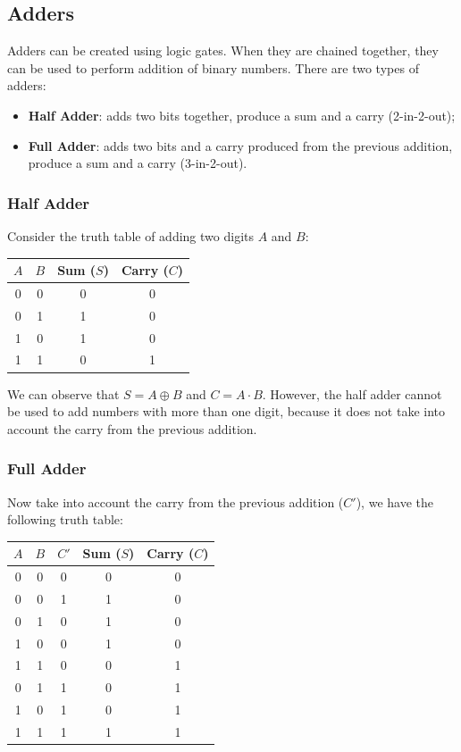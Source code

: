 \subsection{Adders}

Adders can be created using logic gates. When they are chained together, they can be used
to perform addition of binary numbers. There are two types of adders:
\begin{itemize}
    \item \textbf{Half Adder}: adds two bits together, produce a sum and a carry (2-in-2-out);
    \item \textbf{Full Adder}: adds two bits and a carry produced from the previous addition,
                                produce a sum and a carry (3-in-2-out).
\end{itemize}

\subsubsection{Half Adder}

Consider the truth table of adding two digits $A$ and $B$:
\begin{table}[h]
\centering
\begin{tabular}{|c|c||c|c|}
    \hline
    $A$ & $B$ & Sum ($S$) & Carry ($C$) \\
    \hline
    0 & 0 & 0 & 0 \\
    0 & 1 & 1 & 0 \\
    1 & 0 & 1 & 0 \\
    1 & 1 & 0 & 1 \\
    \hline
\end{tabular}
\end{table}

We can observe that $S=A\oplus B$ and $C=A\cdot B$. However, the half adder cannot be used
to add numbers with more than one digit, because it does not take into account the carry
from the previous addition.

\subsubsection{Full Adder}

Now take into account the carry from the previous addition ($C'$), we have the following truth table:
\begin{table}[h]
\centering
\begin{tabular}{|c|c|c||c|c|}
    \hline
    $A$ & $B$ & $C'$ & Sum ($S$) & Carry ($C$) \\
    \hline
    0 & 0 & 0 & 0 & 0 \\
    0 & 0 & 1 & 1 & 0 \\
    0 & 1 & 0 & 1 & 0 \\
    1 & 0 & 0 & 1 & 0 \\
    1 & 1 & 0 & 0 & 1 \\
    0 & 1 & 1 & 0 & 1 \\
    1 & 0 & 1 & 0 & 1 \\
    1 & 1 & 1 & 1 & 1 \\
    \hline
\end{tabular}
\end{table}


